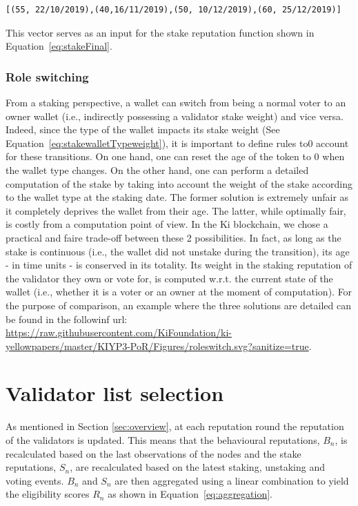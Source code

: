 \documentclass[]{article}
\begin{document}
\begin{lstlisting}[frame=single,  basicstyle=\small]
[(55, 22/10/2019),(40,16/11/2019),(50, 10/12/2019),(60, 25/12/2019)]
\end{lstlisting}
This vector serves as an input for the stake reputation function shown in Equation~\ref{eq:stakeFinal}.

\subsubsection{Role switching}
From a staking perspective, a wallet can switch from being a normal voter to an owner wallet (i.e., indirectly possessing a validator stake weight) and vice versa. Indeed, since the type of the wallet impacts its stake weight (See Equation~\ref{eq:stakewalletTypeweight}), it is important to define rules to0 account for these transitions. On one hand, one can reset the age of the token to 0 when the wallet type changes. On the other hand, one can perform a detailed computation of the stake by taking into account the weight of the stake according to the wallet type at the staking date. The former solution is extremely unfair as it completely deprives the wallet from their age. The latter, while optimally fair, is costly from a computation point of view. In the Ki blockchain, we chose a practical and faire trade-off between these 2 possibilities. In fact, as long as the stake is continuous (i.e., the wallet did not unstake during the transition), its age - in time units - is conserved in its totality. Its weight in the  staking reputation of the validator they own or vote for, is computed w.r.t. the current state of the wallet (i.e., whether it is a voter or an owner at the moment of computation). For the purpose of comparison, an example where the three solutions are detailed can be found in the followinf url: \url{https://raw.githubusercontent.com/KiFoundation/ki-yellowpapers/master/KIYP3-PoR/Figures/roleswitch.svg?sanitize=true}.

\section{Validator list selection}
As mentioned in Section \ref{sec:overview}, at each reputation round the reputation of the validators is updated. This means that the behavioural reputations, $B_n$, is recalculated based on the last observations of the nodes and the stake reputations, $S_n$, are recalculated based on the latest staking, unstaking and voting events. $B_n$ and $S_n$ are then aggregated using a linear combination to yield the eligibility scores $R_n$ as shown in Equation~\ref{eq:aggregation}. 
\end{document}
